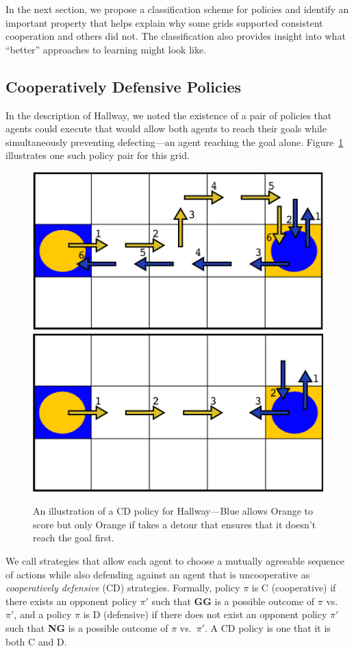 \documentclass[letterpaper]{article}
\begin{document}
In the next section, we propose a classification scheme for policies
and identify an important property that helps explain why some grids
supported consistent cooperation and others did not. The
classification also provides insight into what ``better'' approaches
to learning might look like.

\subsection{Cooperatively Defensive Policies}

In the description of Hallway, we noted the existence of a
pair of policies that agents could execute that would allow both
agents to reach their goals while simultaneously preventing
defecting---an agent reaching the goal alone. Figure~\ref{f:CD}
illustrates one such policy pair for this grid.

\begin{figure}
\centering
\includegraphics[width=0.71\columnwidth]{figures/Hall_CDs/CD_fig2.png}
\includegraphics[width=0.71\columnwidth]{figures/Hall_CDs/CD_fig3.png}
\caption{An illustration of a CD policy for Hallway---Blue allows
Orange to score but only Orange if takes a detour that ensures that it
doesn't reach the goal first.}
\label{f:CD}
\end{figure}

We call strategies that allow each agent to choose a mutually
agreeable sequence of actions while also defending against an agent that is
uncooperative as \emph{cooperatively defensive} (CD)
strategies. Formally, policy $\pi$ is C (cooperative) if there exists an opponent
policy $\pi'$ such that {\bf GG} is a possible outcome of $\pi$ vs.\
$\pi'$, and a policy $\pi$ is D (defensive) if there does not exist an opponent
policy $\pi'$ such that {\bf NG} is a possible outcome of $\pi$ vs.\
$\pi'$. A CD policy is one that it is both C and D.
\end{document}
